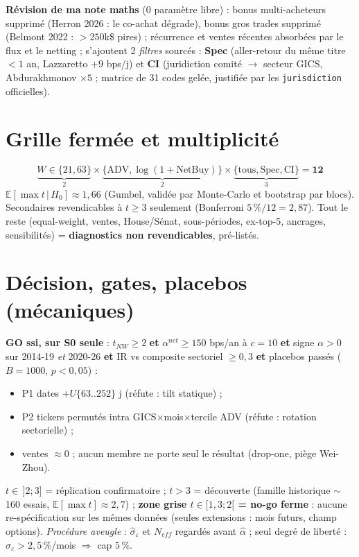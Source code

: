 \documentclass[10pt,a4paper,twocolumn]{article}
\begin{document}
\textbf{Révision de ma note maths} (0 paramètre libre) : bonus multi-acheteurs \textcolor{rouge}{supprimé} (Herron 2026 : le co-achat dégrade), bonus gros trades \textcolor{rouge}{supprimé} (Belmont 2022 : $>250$k\$ pires) ; récurrence et ventes récentes absorbées par le flux et le netting ; s'ajoutent 2 \emph{filtres} sourcés : \textbf{Spec} (aller-retour du même titre $<1$ an, Lazzaretto $+9$ bps/j) et \textbf{CI} (juridiction comité $\to$ secteur GICS, Abdurakhmonov $\times5$ ; matrice de 31 codes gelée, justifiée par les \texttt{jurisdiction} officielles).

\section{Grille fermée et multiplicité}
\[
\underbrace{W\in\{21,63\}}_{2}\times\underbrace{\{\mathrm{ADV},\log(1{+}\mathrm{NetBuy})\}}_{2}\times\underbrace{\{\text{tous},\mathrm{Spec},\mathrm{CI}\}}_{3}=\mathbf{12}
\]
$\mathbb{E}[\max t\,|\,H_0]\approx1{,}66$ (Gumbel, validée par Monte-Carlo et bootstrap par blocs). Secondaires revendicables à $t\geq3$ seulement (Bonferroni $5\,\%/12=2{,}87$). Tout le reste (equal-weight, ventes, House/Sénat, sous-périodes, ex-top-5, ancrages, sensibilités) = \textbf{diagnostics non revendicables}, pré-listés.

\section{Décision, gates, placebos (mécaniques)}
\textbf{GO ssi, sur S0 seule} : $t_{NW}\geq2$ \textbf{et} $\alpha^{net}\geq150$ bps/an à $c{=}10$ \textbf{et} signe $\alpha>0$ sur 2014-19 \emph{et} 2020-26 \textbf{et} IR vs composite sectoriel $\geq0{,}3$ \textbf{et} placebos passés ($B{=}1000$, $p<0{,}05$) :
\begin{itemize}
  \item P1 dates $+U\{63..252\}$ j (réfute : tilt statique) ;
  \item P2 tickers permutés intra GICS$\times$mois$\times$tercile ADV (réfute : rotation sectorielle) ;
  \item ventes $\approx0$ ; aucun membre ne porte seul le résultat (drop-one, piège Wei-Zhou).
\end{itemize}
$t\in\,]2;3]$ = \og réplication confirmatoire\fg{} ; $t>3$ = \og découverte\fg{} (famille historique $\sim$160 essais, $\mathbb{E}[\max t]\approx2{,}7$) ; \textbf{zone grise $t\in[1{,}3;2[$ = no-go ferme} : aucune re-spécification sur les mêmes données (seules extensions : mois futurs, champ options).
\emph{Procédure aveugle} : $\hat\sigma_\varepsilon$ et $N_{eff}$ regardés avant $\hat\alpha$ ; seul degré de liberté : $\hat\sigma_\varepsilon>2{,}5\,\%$/mois $\Rightarrow$ cap $5\,\%$.
\end{document}
